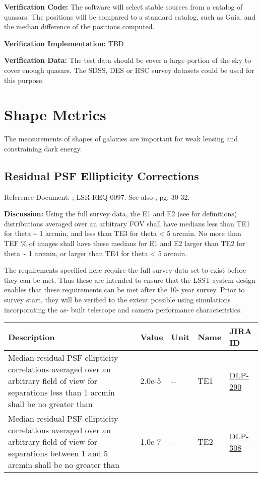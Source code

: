 \documentclass[DM,lsstdraft,toc]{lsstdoc}
\newcommand{\jira}[1]{\href{https://jira.lsstcorp.org/browse/#1}{#1}}
\begin{document}
\textbf{Verification Code:} The software will select stable sources from
a catalog of quasars. The positions will be compared to a standard
catalog, such as Gaia, and the median difference of the positions
computed.

\textbf{Verification Implementation:} TBD

\textbf{Verification Data:} The test data should be cover a large
portion of the sky to cover enough quasars. The SDSS, DES or HSC survey
datasets could be used for this purpose.

\section{Shape Metrics}\label{shape-metrics}

The measurements of shapes of galaxies are important for weak lensing
and constraining dark energy.

\subsection{Residual PSF Ellipticity
Corrections}\label{residual-psf-ellipticity-corrections}

Reference Document: ; LSR-REQ-0097. See also \SRD, pg. 30-32.

\textbf{Discussion:} Using the full survey data, the E1 and E2 (see \SRD
for definitions) distributions averaged over an arbitrary FOV shall have
medians less than TE1 for theta \textasciitilde{} 1 arcmin, and less
than TE3 for theta \textless{} 5 arcmin. No more than TEF \% of images
shall have these medians for E1 and E2 larger than TE2 for theta
\textasciitilde{} 1 arcmin, or larger than TE4 for theta \textless{} 5
arcmin.

The requirements specified here require the full survey data set to
exist before they can be met. Thus these are intended to ensure that the
LSST system design enables that these requirements can be met after the
10- year survey. Prior to survey start, they will be verified to the
extent possible using simulations incorporating the as- built telescope
and camera performance characteristics.

\begin{longtable}[]{@{}p{}llll@{}}
\toprule
Description & Value & Unit & Name & JIRA ID\tabularnewline
\midrule
\endhead
Median residual PSF ellipticity correlations averaged over an arbitrary
field of view for separations less than 1 arcmin shall be no greater
than & 2.0e-5 & -\/- & TE1 & \jira{DLP-290}\tabularnewline
Median residual PSF ellipticity correlations averaged over an arbitrary
field of view for separations between 1 and 5 arcmin shall be no greater
than & 1.0e-7 & -\/- & TE2 & \jira{DLP-308}\tabularnewline
\bottomrule
\end{longtable}
\end{document}
